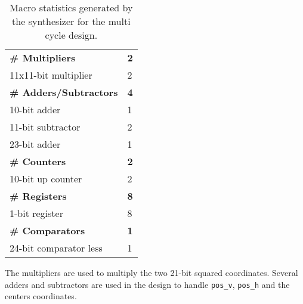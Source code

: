 \documentclass[paper=usletter, fontsize=12pt]{article}
\begin{document}
        \begin{table}[h]
            \caption{Macro statistics generated by the synthesizer for the
            multi cycle design.}
            \label{table:multimacro}
            \centering

            \begin{tabular*}{250pt}{ m{20em}m{1cm} }
                \textbf{\# Multipliers}         & \textbf{2} \\
                 11x11-bit multiplier           & 2 \\
                \textbf{\# Adders/Subtractors}  & \textbf{4} \\
                 10-bit adder                   & 1 \\
                 11-bit subtractor              & 2 \\
                 23-bit adder                   & 1 \\
                \textbf{\# Counters}            & \textbf{2} \\
                 10-bit up counter              & 2 \\
                \textbf{\# Registers}           & \textbf{8} \\
                 1-bit register                 & 8 \\
                \textbf{\# Comparators}         & \textbf{1} \\
                 24-bit comparator less         & 1 \\
            \end{tabular*}

        \end{table}

        The multipliers are used to multiply the two 21-bit squared
        coordinates. Several adders and subtractors are used in the design to
        handle \texttt{pos\_v}, \texttt{pos\_h} and the centers coordinates.
        \newpage
\end{document}
